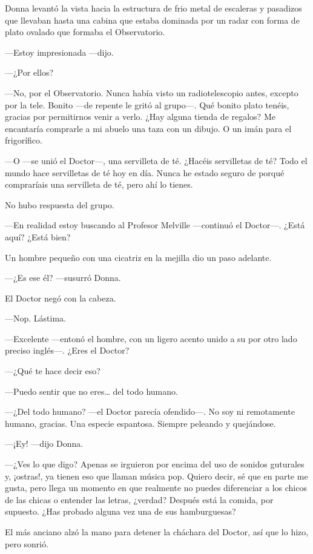 Donna levantó la vista hacia la estructura de frio metal de
escaleras y pasadizos que llevaban hasta una cabina que estaba dominada
por un radar con forma de plato ovalado que formaba el Observatorio.

---Estoy impresionada ---dijo.

---¿Por ellos?

---No, por el Observatorio. Nunca había visto un radiotelescopio
antes, excepto por la tele. Bonito ---de repente le gritó al grupo---.
Qué bonito plato tenéis, gracias por permitirnos venir a verlo. ¿Hay
alguna tienda de regalos? Me encantaría comprarle a mi abuelo una taza
con un dibujo. O un imán para el frigorífico.

---O ---se unió el Doctor---, una servilleta de té. ¿Hacéis servilletas
de té? Todo el mundo hace servilletas de té hoy en día. Nunca he estado
seguro de porqué compraríais una servilleta de té, pero ahí lo tienes.

No hubo respuesta del grupo.

---En realidad estoy buscando al Profesor Melville ---continuó
el Doctor---. ¿Está aquí? ¿Está bien?

Un hombre pequeño con una cicatriz en la mejilla dio un paso
adelante.

---¿Es ese él? ---susurró Donna.

El Doctor negó con la cabeza.

---Nop. Lástima.

---Excelente ---entonó el hombre, con un ligero acento unido a
su por otro lado preciso inglés---. ¿Eres el Doctor?

---¿Qué te hace decir eso?

---Puedo sentir que no eres\ldots{} del todo humano.

---¿Del todo humano? ---el Doctor parecía ofendido---. No soy ni
remotamente humano, gracias. Una especie espantosa. Siempre peleando y
quejándose.

---¡Ey! ---dijo Donna.

---¿Ves lo que digo? Apenas se irguieron por encima del uso de
sonidos guturales y, ¡ostras!, ya tienen eso que llaman música pop.
Quiero decir, sé que en parte me gusta, pero llega un momento en que
realmente no puedes diferenciar a los chicos de las chicas o entender
las letras, ¿verdad? Después está la comida, por supuesto. ¿Has probado
alguna vez una de sus hamburguesas?

El más anciano alzó la mano para detener la cháchara del Doctor,
así que lo hizo, pero sonrió.

